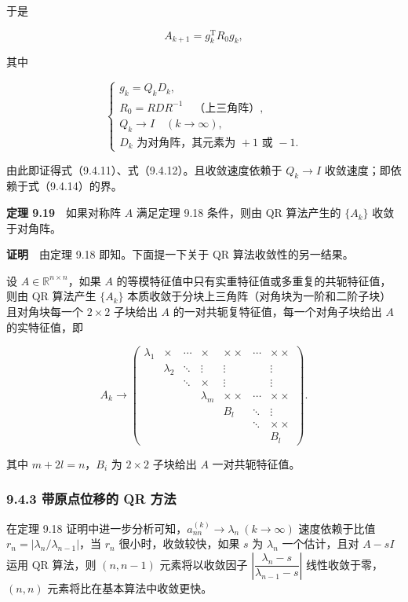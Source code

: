 \documentclass[
  10pt,
  fontset=fandol]{ctexart}
\begin{document}
于是

\[
A_{k+1}=g_k^{\mathrm T}R_0g_k,
\]

其中

\[
\begin{cases}
g_k=Q_kD_k,\\
R_0=RDR^{-1}\quad\text{（上三角阵）},\\
Q_k\to I\quad(k\to\infty),\\
D_k\text{ 为对角阵，其元素为 }+1\text{ 或 }-1.
\end{cases}
\]

由此即证得式（9.4.11）、式（9.4.12）。且收敛速度依赖于 \(Q_k\to I\) 收敛速度；即依赖于式（9.4.14）的界。

\textbf{定理 9.19}　如果对称阵 \(A\) 满足定理 9.18 条件，则由 QR 算法产生的 \(\{A_k\}\) 收敛于对角阵。

\textbf{证明}　由定理 9.18 即知。下面提一下关于 QR 算法收敛性的另一结果。

设 \(A\in\mathbb R^{n\times n}\)，如果 \(A\) 的等模特征值中只有实重特征值或多重复的共轭特征值，则由 QR 算法产生 \(\{A_k\}\) 本质收敛于分块上三角阵（对角块为一阶和二阶子块）且对角块每一个 \(2\times2\) 子块给出 \(A\) 的一对共轭复特征值，每一个对角子块给出 \(A\) 的实特征值，即

\[
A_k\to\begin{pmatrix}
\lambda_1&\times&\cdots&\times&\times\times&\cdots&\times\times\\
&\lambda_2&\ddots&\vdots&\vdots&&\vdots\\
&&\ddots&\times&\vdots&&\vdots\\
&&&\lambda_m&\times\times&\cdots&\times\times\\
&&&&B_l&\ddots&\vdots\\
&&&&&\ddots&\times\times\\
&&&&&&B_l
\end{pmatrix}.
\]

其中 \(m+2l=n\)，\(B_i\) 为 \(2\times2\) 子块给出 \(A\) 一对共轭特征值。

\subsubsection{9.4.3 带原点位移的 QR 方法}\label{ux5e26ux539fux70b9ux4f4dux79fbux7684-qr-ux65b9ux6cd5}

在定理 9.18 证明中进一步分析可知，\(a_{nn}^{(k)}\to\lambda_n\ (k\to\infty)\) 速度依赖于比值 \(r_n=|\lambda_n/\lambda_{n-1}|\)，当 \(r_n\) 很小时，收敛较快，如果 \(s\) 为 \(\lambda_n\) 一个估计，且对 \(A-sI\) 运用 QR 算法，则 \((n,n-1)\) 元素将以收敛因子 \(\left|\dfrac{\lambda_n-s}{\lambda_{n-1}-s}\right|\) 线性收敛于零，\((n,n)\) 元素将比在基本算法中收敛更快。
\end{document}
